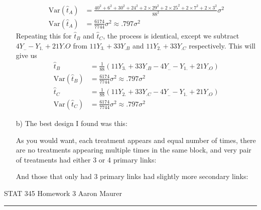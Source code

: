 \documentclass[11pt]{article}
\newcommand{\var}{\mathrm{Var}}
\theoremstyle{definition}
\begin{document}
\begin{itemize}
\begin{align*}
            \var(\hat t_A) &=\frac{40^2 + 6^2 + 30^2 +24^2 + 2\times29^2 + 2\times 25^2 + 2\times 7^2 + 2\times 3^2}{88^2}\sigma^2 \\
            \var(\hat t_A) &=\frac{6174}{7744}\sigma^2 \approx .797\sigma^2
        \end{align*}
        Repeating this for $\hat t_B$ and $\hat t_C$, the process is identical, except we subtract \(4Y_{..} - Y_{1.} + 21Y{.O}\) from \(11Y_{3.} + 33Y_{.B}\) and \(11Y_{2.} + 33Y_{.C}\) respectively. This will give us
        \begin{align*}
            \hat t_B &= \frac{1}{88}(11Y_{3.} + 33Y_{.B} - 4Y_{..} - Y_{1.} + 21Y_{.O}) \\
            \var(\hat t_B) &=\frac{6174}{7744}\sigma^2 \approx .797\sigma^2 \\
            \hat t_C &= \frac{1}{88}(11Y_{2.} + 33Y_{.C} - 4Y_{..} - Y_{1.} + 21Y_{.O}) \\
            \var(\hat t_C) &=\frac{6174}{7744}\sigma^2 \approx .797\sigma^2
        \end{align*}
    \item[b)]
        The best design I found was this:  \\
            \FloatBarrier
             
            \FloatBarrier
        As you would want, each treatment appears and equal number of times, there are no treatments appearing multiple times in the same block, and very pair of treatments had either 3 or 4 primary links:
            \FloatBarrier
             
            \FloatBarrier
        And those that only had 3 primary links had slightly more secondary links:
            \FloatBarrier
             
            \FloatBarrier
\end{itemize}

\newpage
STAT 345 Homework 3 \hfill Aaron Maurer
\vspace{2mm}
\hrule
\vspace{2mm}
\end{document}
